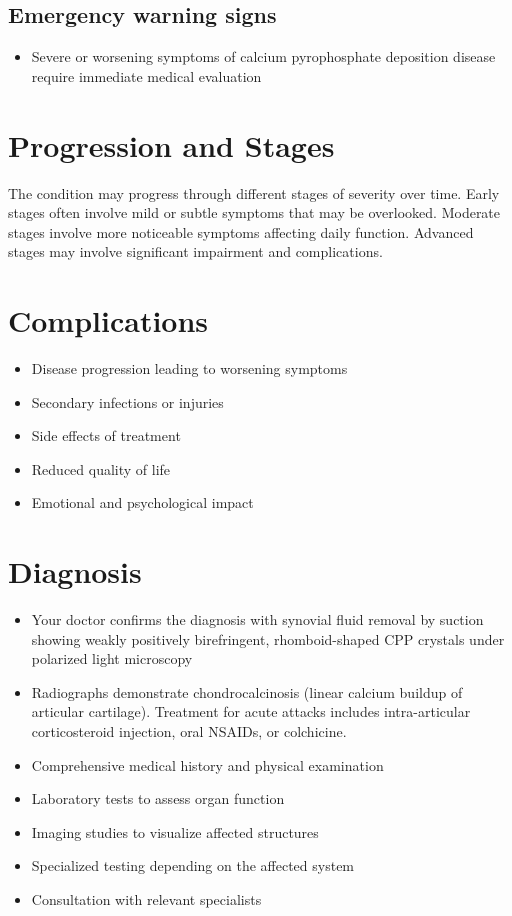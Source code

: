 \subsection{Emergency warning signs}
\begin{itemize}[noitemsep]
  \item Severe or worsening symptoms of calcium pyrophosphate deposition disease require immediate medical evaluation
\end{itemize}
\section{Progression and Stages}
The condition may progress through different stages of severity over time. Early stages often involve mild or subtle symptoms that may be overlooked. Moderate stages involve more noticeable symptoms affecting daily function. Advanced stages may involve significant impairment and complications.
\section{Complications}
\begin{itemize}[noitemsep]
  \item Disease progression leading to worsening symptoms
  \item Secondary infections or injuries
  \item Side effects of treatment
  \item Reduced quality of life
  \item Emotional and psychological impact
\end{itemize}
\section{Diagnosis}
\begin{itemize}[noitemsep]
  \item Your doctor confirms the diagnosis with synovial fluid removal by suction showing weakly positively birefringent, rhomboid-shaped CPP crystals under polarized light microscopy
  \item Radiographs demonstrate chondrocalcinosis (linear calcium buildup of articular cartilage). Treatment for acute attacks includes intra-articular corticosteroid injection, oral NSAIDs, or colchicine.
  \item Comprehensive medical history and physical examination
  \item Laboratory tests to assess organ function
  \item Imaging studies to visualize affected structures
  \item Specialized testing depending on the affected system
  \item Consultation with relevant specialists
\end{itemize}
